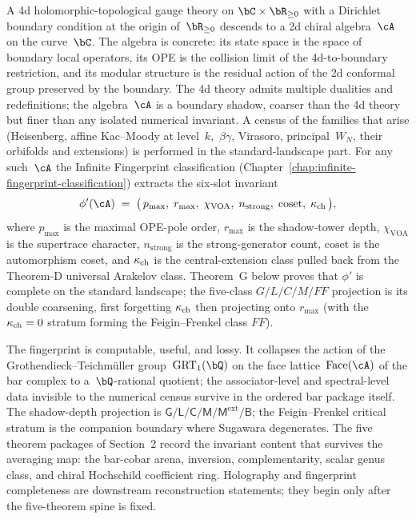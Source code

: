 \noindent
A 4d holomorphic-topological gauge theory on $\bC\times\bR_{\ge 0}$
with a Dirichlet boundary condition at the origin of~$\bR_{\ge 0}$
descends to a 2d chiral algebra~$\cA$ on the curve~$\bC$. The algebra
is concrete: its state space is the space of boundary local
operators, its OPE is the collision limit of the 4d-to-boundary
restriction, and its modular structure is the residual action of the
2d conformal group preserved by the boundary. The 4d theory admits
multiple dualities and redefinitions; the algebra~$\cA$ is a
boundary shadow, coarser than the 4d theory but finer than any
isolated numerical invariant. A census of the families that arise
(Heisenberg, affine Kac--Moody at level~$k$,~$\beta\gamma$, Virasoro,
principal~$W_N$, their orbifolds and extensions) is performed in
the standard-landscape part. For any such~$\cA$ the Infinite Fingerprint classification
(Chapter~\ref{chap:infinite-fingerprint-classification}) extracts
the six-slot invariant
\[
 \phi'(\cA) \;=\;
 \bigl(\,p_{\max},\;r_{\max},\;\chi_{\mathrm{VOA}},\;
 n_{\mathrm{strong}},\;\mathrm{coset},\;\kch\,\bigr),
\]
where $p_{\max}$ is the maximal OPE-pole order, $r_{\max}$ is the
shadow-tower depth, $\chi_{\mathrm{VOA}}$ is the supertrace
character, $n_{\mathrm{strong}}$ is the strong-generator count,
$\mathrm{coset}$ is the automorphism coset, and $\kappa_{\mathrm{ch}}$ is the
central-extension class pulled back from the Theorem-D universal
Arakelov class. Theorem~G below proves that $\phi'$ is complete on
the standard landscape; the five-class $G/L/C/M/FF$
projection is its double coarsening, first forgetting $\kappa_{\mathrm{ch}}$ then
projecting onto $r_{\max}$ (with the $\kappa_{\mathrm{ch}}=0$ stratum forming the
Feigin--Frenkel class $FF$).

The fingerprint is computable, useful, and lossy. It collapses the
action of the Grothendieck--Teichm{\"u}ller group~$\GRTone(\bQ)$ on
the face lattice~$\Face(\cA)$ of the bar complex to a~$\bQ$-rational
quotient; the associator-level and spectral-level data invisible to
the numerical census survive in the ordered bar package itself. The
shadow-depth projection is
$\mathsf G/\mathsf L/\mathsf C/\mathsf M/
\mathsf M^{\mathrm{ext}}/\mathsf B$; the Feigin--Frenkel critical
stratum is the companion boundary where Sugawara degenerates. The five
theorem packages of Section~2 record
the invariant content that
survives the averaging map: the bar-cobar arena, inversion,
complementarity, scalar genus class, and chiral Hochschild coefficient
ring. Holography and fingerprint completeness are downstream
reconstruction statements; they begin only after the five-theorem
spine is fixed.

